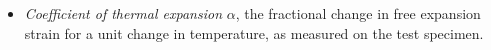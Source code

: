 

\begin{itemize}
  \item {\em Coefficient of thermal expansion} $\alpha$, the fractional change in free expansion strain for a unit change in temperature, as measured on the test specimen.

\end{itemize}
